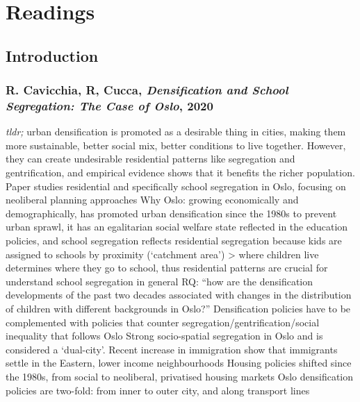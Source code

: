 \documentclass{article}
\begin{document}
\section{Readings}

\subsection{Introduction}

\subsubsection{R. Cavicchia, R, Cucca, \textit{Densification and School Segregation: The Case of Oslo}, 2020}

\begin{outline}
	\1 \textit{tldr;} urban densification is promoted as a desirable thing in cities, making them more sustainable, better social mix, better conditions to live together. However, they can create undesirable residential patterns like segregation and gentrification, and empirical evidence shows that it benefits the richer population. Paper studies residential and specifically school segregation in Oslo, focusing on neoliberal planning approaches
	\1 Why Oslo: growing economically and demographically, has promoted urban densification since the 1980s to prevent urban sprawl, it has an egalitarian social welfare state reflected in the education policies, and school segregation reflects residential segregation because kids are assigned to schools by proximity (`catchment area') > where children live determines where they go to school, thus residential patterns are crucial for understand school segregation in general
	\1 RQ: ``how are the densification developments of the past two decades associated with changes in the distribution of children with different backgrounds in Oslo?''
	\1 Densification policies have to be complemented with policies that counter segregation/gentrification/social inequality that follows
	\1 Oslo
		\2 Strong socio-spatial segregation in Oslo and is considered a `dual-city'. Recent increase in immigration show that immigrants settle in the Eastern, lower income neighbourhoods
		\2 Housing policies shifted since the 1980s, from social to neoliberal, privatised housing markets
		\2 Oslo densification policies are two-fold: from inner to outer city, and along transport lines
\end{outline}
\end{document}
